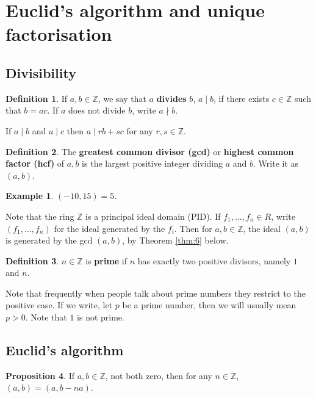 \documentclass{article}
\newcommand{\Z}{\mathbb{Z}}
\newcommand{\rb}[1]{\left( #1 \right)}
\theoremstyle{definition}\newtheorem{definition}{Definition}
\theoremstyle{definition}\newtheorem{remark}[definition]{Remark}
\theoremstyle{definition}\newtheorem*{example}{Example}
\theoremstyle{definition}\newtheorem*{note}{Note}
\newtheorem{proposition}[definition]{Proposition}
\begin{document}
\pagebreak

\section{Euclid's algorithm and unique factorisation}

\subsection{Divisibility}

\begin{definition}
If $ a, b \in \Z $, we say that $ a $ \textbf{divides} $ b $, $ a \mid b $, if there exists $ c \in \Z $ such that $ b = ac $. If $ a $ does not divide $ b $, write $ a \nmid b $.
\end{definition}

If $ a \mid b $ and $ a \mid c $ then $ a \mid rb + sc $ for any $ r, s \in \Z $.

\begin{definition}
The \textbf{greatest common divisor (gcd)} or \textbf{highest common factor (hcf)} of $ a, b $ is the largest positive integer dividing $ a $ and $ b $. Write it as $ \rb{a, b} $.
\end{definition}

\begin{example}
$ \rb{-10, 15} = 5 $.
\end{example}

Note that the ring $ \Z $ is a principal ideal domain (PID). If $ f_1, \dots, f_n \in R $, write $ \rb{f_1, \dots, f_n} $ for the ideal generated by the $ f_i $. Then for $ a, b \in \Z $, the ideal $ \rb{a, b} $ is generated by the gcd $ \rb{a, b} $, by Theorem \ref{thm:6} below.

\begin{definition}
$ n \in \Z $ is \textbf{prime} if $ n $ has exactly two positive divisors, namely $ 1 $ and $ n $.
\end{definition}

Note that frequently when people talk about prime numbers they restrict to the positive case. If we write, let $ p $ be a prime number, then we will usually mean $ p > 0 $. Note that $ 1 $ is not prime.

\subsection{Euclid's algorithm}

\begin{proposition}
If $ a, b \in \Z $, not both zero, then for any $ n \in \Z $, $ \rb{a, b} = \rb{a, b - na} $.
\end{proposition}
\end{document}
